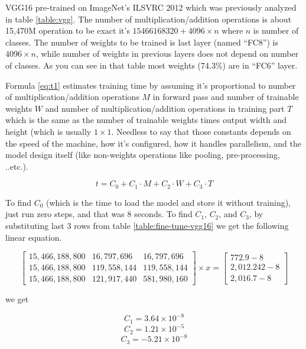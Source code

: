 VGG16\autocite{simonyan2014very} pre-trained on ImageNet's ILSVRC 2012\autocite{deng2012imagenet}
which was previously analyzed in table \ref{table:vgg}.
The number of multiplication/addition operations is about 15,470M operation
to be exact it's \(15466168320+4096\times n\) where \(n\) is number of classes.
The number of weights to be trained is last layer (named ``FC8'') is \( 4096\times n \),
while number of weights in previous layers does not depend on number of classes.
As you can see in that table most weights (74.3\%) are in ``FC6'' layer.

Formula \ref{eq:t1} estimates training time by assuming it's proportional to number of multiplication/addition operations \(M\)
in forward pass and number of trainable weights \(W\)
and number of multiplication/addition operations in training part \(T\)
which is the same as the number of trainable weights times output width and height (which is usually \(1\times 1\).
Needless to say that those constants depends on the speed of the machine, how it's configured,
how it handles parallelism, and the model design itself (like non-weights operations like pooling, pre-processing, ..etc.).

\begin{equation}
t = C_0 + C_1 \cdot M + C_2 \cdot W + C_3 \cdot T
\label{eq:t1}
\end{equation}

To find \(C_0\) (which is the time to load the model and store it without training),
just run zero steps, and that was 8 seconds.
To find \(C_1\), \(C_2\), and \(C_3\), by substituting last 3 rows from table \ref{table:fine-tune-vgg16}
we get the following linear equation.

\begin{equation}
\begin{bmatrix}
15,466,188,800 &  16,797,696 &  16,797,696 \\
15,466,188,800 & 119,558,144 & 119,558,144 \\
15,466,188,800 & 121,917,440 & 581,980,160
\end{bmatrix}
\times x = 
\begin{bmatrix}
  772.9-8 \\
2,012.242-8 \\
2,016.7-8
\end{bmatrix}
\label{eq:t_vgg}
\end{equation}

we get 

\[ C_1 = 3.64 \times 10^{-8} \]
\[ C_2 = 1.21 \times 10^{-5} \]
\[ C_3 = -5.21 \times 10^{-8} \]

